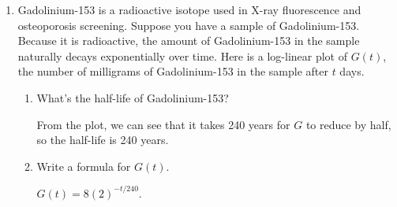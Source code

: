 \documentclass{article}
\begin{document}
\begin{enumerate}
\begin{enumerate}[resume]
  \end{enumerate}

\item  \label{semi-log-gd-153} Gadolinium-153 is a radioactive isotope used in X-ray fluorescence and osteoporosis screening. Suppose you have a sample of Gadolinium-153. Because it is radioactive, the amount of Gadolinium-153 in the sample naturally decays exponentially over time. Here is a log-linear plot of $G(t)$, the number of milligrams of Gadolinium-153 in the sample after $t$ days.

  \parbox[t]{2.4in}{\vspace{-8pt}
  }  
  \begin{minipage}[t]{\linewidth-2.7in}
    \vspace{-8pt}
    \begin{enumerate}
    \item
      \begin{problem}[0.25in]
        What's the half-life of Gadolinium-153?  
      \end{problem}

      \begin{solution}
        From the plot, we can see that it takes 240 years for $G$
        to reduce by half, so the half-life is 240 years.
      \end{solution}

    \item


      \begin{problem}
        Write a formula for $G(t)$.
      \end{problem}

      \begin{solution}
        $G(t) = 8(2)^{-t/240}$.
      \end{solution}
    \end{enumerate}    
  \end{minipage}


\end{enumerate}
\end{document}
